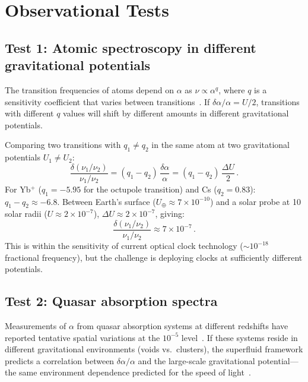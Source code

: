 \documentclass[12pt, a4paper]{article}
\begin{document}
\section{Observational Tests}
\label{sec:tests}

\subsection{Test 1: Atomic spectroscopy in different
gravitational potentials}

The transition frequencies of atoms depend on
$\alpha$ as $\nu \propto \alpha^q$, where $q$ is a
sensitivity coefficient that varies between
transitions~\cite{safronova_2018}. If
$\delta\alpha/\alpha = U/2$, transitions with
different $q$ values will shift by different amounts
in different gravitational potentials.

Comparing two transitions with $q_1 \neq q_2$ in
the same atom at two gravitational potentials
$U_1 \neq U_2$:
\begin{equation}
    \frac{\delta(\nu_1/\nu_2)}{\nu_1/\nu_2}
    = (q_1 - q_2)\,\frac{\delta\alpha}{\alpha}
    = (q_1 - q_2)\,\frac{\Delta U}{2}\,.
\label{eq:clock_test}
\end{equation}
For Yb$^+$ ($q_1 = -5.95$ for the octupole
transition) and Cs ($q_2 = 0.83$):
$q_1 - q_2 \approx -6.8$. Between Earth's surface
($U_\oplus \approx 7 \times 10^{-10}$) and a solar
probe at 10 solar radii ($U \approx 2 \times
10^{-7}$), $\Delta U \approx 2 \times 10^{-7}$,
giving:
\begin{equation}
    \frac{\delta(\nu_1/\nu_2)}{\nu_1/\nu_2}
    \approx 7 \times 10^{-7}\,.
\end{equation}
This is within the sensitivity of current optical
clock technology ($\sim 10^{-18}$ fractional
frequency), but the challenge is deploying clocks
at sufficiently different potentials.

\subsection{Test 2: Quasar absorption spectra}

Measurements of $\alpha$ from quasar absorption
systems at different redshifts have reported
tentative spatial variations at the $10^{-5}$
level~\cite{webb_2011}. If these systems reside in
different gravitational environments (voids vs.\
clusters), the superfluid framework predicts a
correlation between $\delta\alpha/\alpha$ and the
large-scale gravitational potential---the same
environment dependence predicted for the speed of
light~\cite{kulangiev_variable_c}.
\end{document}

